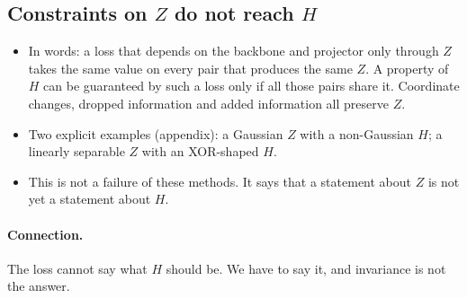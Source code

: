 \documentclass[11pt]{article}
\numberwithin{equation}{section}
\theoremstyle{definition}
\theoremstyle{remark}
\begin{document}
\subsection{Constraints on \(Z\) do not reach \(H\)}
\begin{itemize}
    \item In words: a loss that depends on the backbone and projector only through \(Z\)
    takes the same value on every pair that produces the same \(Z\). A property of \(H\)
    can be guaranteed by such a loss only if all those pairs share it. Coordinate changes,
    dropped information and added information all preserve \(Z\).
    \item Two explicit examples (appendix): a Gaussian \(Z\) with a non-Gaussian \(H\); a
    linearly separable \(Z\) with an XOR-shaped \(H\).
    \item This is not a failure of these methods. It says that a statement about \(Z\) is
    not yet a statement about \(H\).
\end{itemize}

\paragraph{Connection.}
The loss cannot say what \(H\) should be. We have to say it, and invariance is not the
answer.
\end{document}
